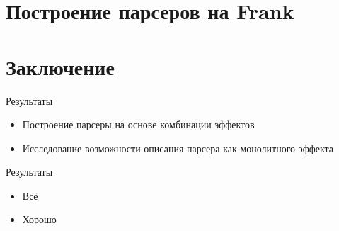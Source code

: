 


\section{Построение парсеров на Frank}






\section{Заключение}
\begin{frame}{Результаты}
  \begin{itemize}
    \item Построение парсеры на основе комбинации эффектов
    \item Исследование возможности описания парсера как монолитного эффекта
  \end{itemize}
\end{frame}

\begin{frame}[fragile]{Результаты}
\begin{itemize}
\item Всё
\item Хорошо
\end{itemize}
\end{frame}


